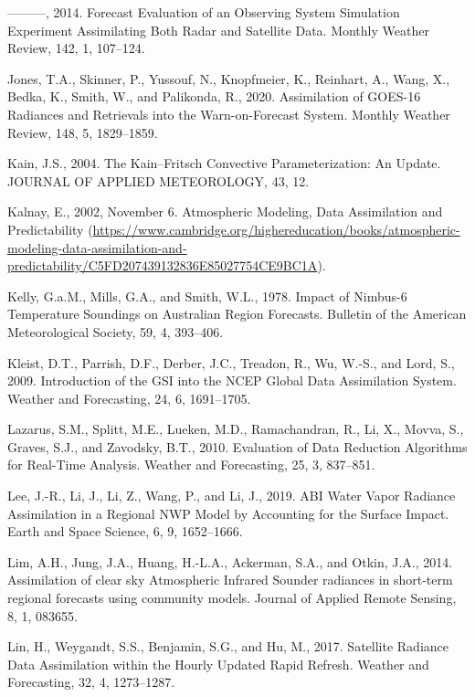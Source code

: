 \documentclass[12pt,oneside,a4paper]{reedthesis}
\begin{document}
\leavevmode\hypertarget{ref-jones2014}{}%
---------, 2014. Forecast Evaluation of an Observing System Simulation Experiment Assimilating Both Radar and Satellite Data. Monthly Weather Review, 142, 1, 107--124.

\leavevmode\hypertarget{ref-jones2020}{}%
Jones, T.A., Skinner, P., Yussouf, N., Knopfmeier, K., Reinhart, A., Wang, X., Bedka, K., Smith, W., and Palikonda, R., 2020. Assimilation of GOES-16 Radiances and Retrievals into the Warn-on-Forecast System. Monthly Weather Review, 148, 5, 1829--1859.

\leavevmode\hypertarget{ref-kain2004}{}%
Kain, J.S., 2004. The Kain--Fritsch Convective Parameterization: An Update. JOURNAL OF APPLIED METEOROLOGY, 43, 12.

\leavevmode\hypertarget{ref-kalnay2002}{}%
Kalnay, E., 2002, November 6. Atmospheric Modeling, Data Assimilation and Predictability (\url{https://www.cambridge.org/highereducation/books/atmospheric-modeling-data-assimilation-and-predictability/C5FD207439132836E85027754CE9BC1A}).

\leavevmode\hypertarget{ref-kelly1978}{}%
Kelly, G.a.M., Mills, G.A., and Smith, W.L., 1978. Impact of Nimbus-6 Temperature Soundings on Australian Region Forecasts. Bulletin of the American Meteorological Society, 59, 4, 393--406.

\leavevmode\hypertarget{ref-kleist2009}{}%
Kleist, D.T., Parrish, D.F., Derber, J.C., Treadon, R., Wu, W.-S., and Lord, S., 2009. Introduction of the GSI into the NCEP Global Data Assimilation System. Weather and Forecasting, 24, 6, 1691--1705.

\leavevmode\hypertarget{ref-lazarus2010}{}%
Lazarus, S.M., Splitt, M.E., Lueken, M.D., Ramachandran, R., Li, X., Movva, S., Graves, S.J., and Zavodsky, B.T., 2010. Evaluation of Data Reduction Algorithms for Real-Time Analysis. Weather and Forecasting, 25, 3, 837--851.

\leavevmode\hypertarget{ref-lee2019}{}%
Lee, J.-R., Li, J., Li, Z., Wang, P., and Li, J., 2019. ABI Water Vapor Radiance Assimilation in a Regional NWP Model by Accounting for the Surface Impact. Earth and Space Science, 6, 9, 1652--1666.

\leavevmode\hypertarget{ref-lim2014}{}%
Lim, A.H., Jung, J.A., Huang, H.-L.A., Ackerman, S.A., and Otkin, J.A., 2014. Assimilation of clear sky Atmospheric Infrared Sounder radiances in short-term regional forecasts using community models. Journal of Applied Remote Sensing, 8, 1, 083655.

\leavevmode\hypertarget{ref-lin2017a}{}%
Lin, H., Weygandt, S.S., Benjamin, S.G., and Hu, M., 2017. Satellite Radiance Data Assimilation within the Hourly Updated Rapid Refresh. Weather and Forecasting, 32, 4, 1273--1287.
\end{document}
